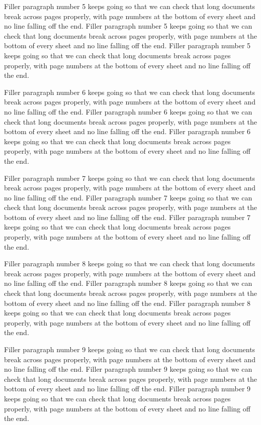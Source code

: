 \documentclass[11pt]{article}
\begin{document}
Filler paragraph number 5 keeps going so that we can check that long documents break across pages properly, with page numbers at the bottom of every sheet and no line falling off the end. Filler paragraph number 5 keeps going so that we can check that long documents break across pages properly, with page numbers at the bottom of every sheet and no line falling off the end. Filler paragraph number 5 keeps going so that we can check that long documents break across pages properly, with page numbers at the bottom of every sheet and no line falling off the end. 


Filler paragraph number 6 keeps going so that we can check that long documents break across pages properly, with page numbers at the bottom of every sheet and no line falling off the end. Filler paragraph number 6 keeps going so that we can check that long documents break across pages properly, with page numbers at the bottom of every sheet and no line falling off the end. Filler paragraph number 6 keeps going so that we can check that long documents break across pages properly, with page numbers at the bottom of every sheet and no line falling off the end. 


Filler paragraph number 7 keeps going so that we can check that long documents break across pages properly, with page numbers at the bottom of every sheet and no line falling off the end. Filler paragraph number 7 keeps going so that we can check that long documents break across pages properly, with page numbers at the bottom of every sheet and no line falling off the end. Filler paragraph number 7 keeps going so that we can check that long documents break across pages properly, with page numbers at the bottom of every sheet and no line falling off the end. 


Filler paragraph number 8 keeps going so that we can check that long documents break across pages properly, with page numbers at the bottom of every sheet and no line falling off the end. Filler paragraph number 8 keeps going so that we can check that long documents break across pages properly, with page numbers at the bottom of every sheet and no line falling off the end. Filler paragraph number 8 keeps going so that we can check that long documents break across pages properly, with page numbers at the bottom of every sheet and no line falling off the end. 


Filler paragraph number 9 keeps going so that we can check that long documents break across pages properly, with page numbers at the bottom of every sheet and no line falling off the end. Filler paragraph number 9 keeps going so that we can check that long documents break across pages properly, with page numbers at the bottom of every sheet and no line falling off the end. Filler paragraph number 9 keeps going so that we can check that long documents break across pages properly, with page numbers at the bottom of every sheet and no line falling off the end. 
\end{document}
